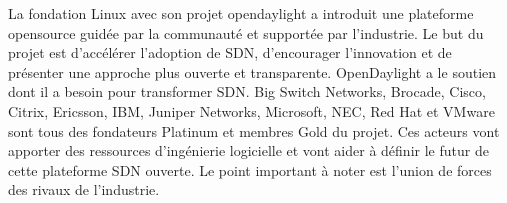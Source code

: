 
La fondation Linux avec son projet \gls{opendaylight} a introduit une plateforme \gls{opensource} guidée par la communauté et supportée par l'industrie. Le but du projet est d'accélérer l'adoption de SDN, d'encourager l'innovation et de présenter une approche plus ouverte et transparente. OpenDaylight a le soutien dont il a besoin pour transformer SDN. Big Switch Networks, Brocade, Cisco, Citrix, Ericsson, IBM, Juniper Networks, Microsoft, NEC, Red Hat et VMware sont tous des fondateurs Platinum et membres Gold du projet. Ces acteurs vont apporter des ressources d'ingénierie logicielle et vont aider à définir le futur de cette plateforme SDN ouverte. Le point important à noter est l'union de forces des rivaux de l'industrie. \cite{ExecutiveGuideToSDNLinux}







